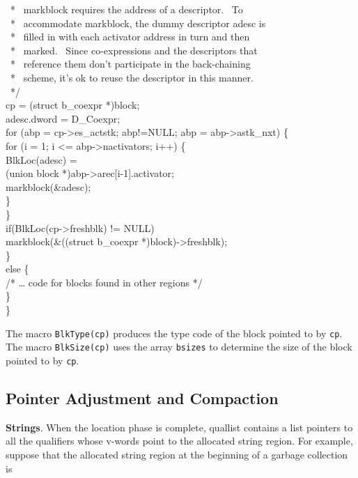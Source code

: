 \begin{iconcode}
\>\>\ * \ markblock requires the address of a descriptor. \ To\\
\>\>\ * \ accommodate markblock, the dummy descriptor adesc is\\
\>\>\ * \ filled in with each activator address in turn and then\\
\>\>\ * \ marked. \ Since co-expressions and the descriptors that\\
\>\>\ * \ reference them don't participate in the back-chaining\\
\>\>\ * \ scheme, it's ok to reuse the descriptor in this manner.\\
\>\>\ */\\
\>\>cp = (struct b\_coexpr *)block;\\
\>\>adesc.dword = D\_Coexpr;\\
\>\>for (abp = cp->es\_actstk; abp!=NULL; abp = abp->astk\_nxt) \{\\
\>\>\>for (i = 1; i <= abp->nactivators; i++) \{\\
\>\>\>\>BlkLoc(adesc) =\\
\>\>\>\>\>(union block *)abp->arec[i-1].activator;\\
\>\>\>\>markblock(\&adesc);\\
\>\>\>\>\}\\
\>\>\>\}\\
\>\>if(BlkLoc(cp->freshblk) != NULL)\\
\>\>\>markblock(\&((struct b\_coexpr *)block)->freshblk);\\
\>\>\}\\
\>else \{\\
\>\>/* {\dots} code for blocks found in other regions */\\
\>\>\}\\
\>\}
\end{iconcode}

The macro \texttt{BlkType(cp)} produces the type code of the block
pointed to by \texttt{cp}. The macro \texttt{BlkSize(cp)} uses the
array \texttt{bsizes} to determine the size of the block pointed to by
\texttt{cp}.

\subsection{Pointer Adjustment and Compaction}

\textbf{Strings}. When the location phase is complete, quallist
contains a list pointers to all the qualifiers whose v-words point to
the allocated string region. For example, suppose that the allocated
string region at the beginning of a garbage collection is

